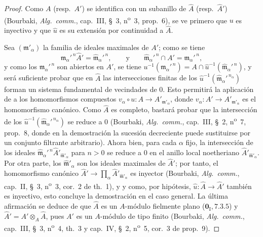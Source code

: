 \begin{proof}
Como $A$ (resp.\ $A'$) se identifica con un subanillo de $\widehat A$ (resp.\ $\widehat{A}'$) (Bourbaki,
\emph{Alg.\ comm.}, cap.~III, \S~3, n\textsuperscript{o}~3, prop.~6), se ve primero que $u$ es inyectivo
y que $\widehat u$ es su extensión por continuidad a $\widehat A$.

Sea $(\mathfrak m'_\alpha)$ la familia de ideales maximales de $A'$; como se tiene
\[
\mathfrak m_\alpha'^{\,n}\widehat{A}'
=\widehat{\mathfrak m}_\alpha'^{\,n},
\qquad\text{y}\qquad
\widehat{\mathfrak m}_\alpha'^{\,n}\cap A'
=\mathfrak m_\alpha'^{\,n},
\]
y como los $\mathfrak m_\alpha'^{\,n}$ son abiertos en $A'$, se tiene
$u^{-1}(\mathfrak m_\alpha'^{\,n})
=A\cap\widehat u^{-1}(\widehat{\mathfrak m}_\alpha'^{\,n})$, y será suficiente probar que en
$\widehat A$ las intersecciones finitas de los $\widehat u^{-1}(\widehat{\mathfrak m}_\alpha'^{\,n_\alpha})$ forman un sistema fundamental de vecindades
de $0$. Esto permitirá la aplicación de  a los homomorfismos compuestos
$v_\alpha\circ u:A\to A'_{\mathfrak m'_\alpha}$, donde
$v_\alpha:A'\to A'_{\mathfrak m'_\alpha}$ es el homomorfismo canónico. Como $\widehat A$ es completo, bastará
probar que la intersección de los $\widehat u^{-1}(\widehat{\mathfrak m}_\alpha'^{\,n_\alpha})$ se reduce a $0$ (Bourbaki,
\emph{Alg.\ comm.}, cap.~III, \S~2, n\textsuperscript{o}~7, prop.~8, donde en la demostración la sucesión decreciente puede sustituirse por un conjunto
filtrante arbitrario). Ahora bien, para cada $\alpha$
fijo, la intersección de los ideales $\widehat{\mathfrak m}_\alpha'^{\,n}\widehat{A}'_{\widehat{\mathfrak m}'_\alpha}$ para $n>0$ se reduce a $0$ en el
anillo local noetheriano $\widehat{A}'_{\widehat{\mathfrak m}'_\alpha}$.
Por otra parte, los $\widehat{\mathfrak m}'_\alpha$ son los ideales maximales de $\widehat{A}'$; por tanto, el homomorfismo canónico
$\widehat{A}'\to\prod_\alpha\widehat{A}'_{\widehat{\mathfrak m}'_\alpha}$ es inyector (Bourbaki, \emph{Alg.\ comm.}, cap.~II, \S~3, n\textsuperscript{o}~3, cor.~2 de th.~1), y
y como, por hipótesis, $\widehat u:\widehat A\to\widehat{A}'$ también es inyectivo, esto concluye la demostración en
el caso general. La última afirmación se deduce de que $\widehat A$ es un $A$-módulo fielmente
plano ($\mathbf 0_{\mathrm I},7.3.5$) y $\widehat{A}'=A'\otimes_A\widehat A$, pues $A'$ es un $A$-módulo de tipo finito
(Bourbaki, \emph{Alg.\ comm.}, cap.~III, \S~3, n\textsuperscript{o}~4, th.~3 y cap.~IV, \S~2, n\textsuperscript{o}~5, cor.~3 de prop.~9).
\end{proof}

